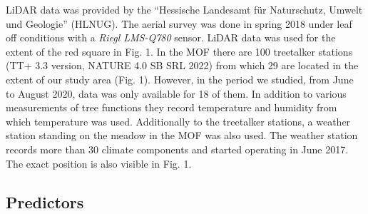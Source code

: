 \documentclass[5p]{elsarticle} %
\begin{document}
LiDAR data was provided by the “Hessische Landesamt für Naturschutz, Umwelt und Geologie” (HLNUG). The aerial survey was done in spring 2018 under leaf off conditions with a \emph{Riegl LMS-Q780} sensor. LiDAR data was used for the extent of the red square in Fig. 1. In the MOF there are 100 treetalker stations (TT+ 3.3 version, NATURE 4.0 SB SRL 2022) from which 29 are located in the extent of our study area (Fig. 1). However, in the period we studied, from June to August 2020, data was only available for 18 of them. In addition to various measurements of tree functions they record temperature and humidity from which temperature was used. Additionally to the treetalker stations, a weather station standing on the meadow in the MOF was also used. The weather station records more than 30 climate components and started operating in June 2017. The exact position is also visible in Fig. 1.


\hypertarget{predictors}{%
\subsection{\texorpdfstring{Predictors\\
}{Predictors }}\label{Predictors}}
\end{document}
